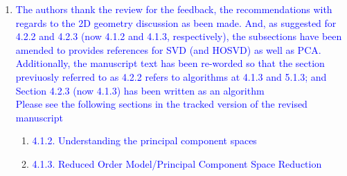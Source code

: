 \documentclass[11pt]{letter} %
\newcommand{\blue}{\textcolor{blue}}
\begin{document}
\begin{letter}
{\begin{enumerate}
\begin{enumerate}
 \begin{enumerate}
 \item \label{R_R2_GeomSetupAlgorithm_1} \blue{The authors thank the review for the feedback, the recommendations with regards to the 2D geometry discussion as been made. And, as suggested for 4.2.2 and 4.2.3 (now 4.1.2 and 4.1.3, respectively), the subsections have been amended to provides references for SVD (and HOSVD) as well as PCA. Additionally, the manuscript text has been re-worded so that the section previuosly referred to as 4.2.2 refers to algorithms at 4.1.3 and 5.1.3; and Section 4.2.3 (now 4.1.3) has been written as an algorithm}\\
   \blue{Please see the following sections in the tracked version of the revised manuscript}
   \begin{enumerate}
 \item \blue{4.1.2. Understanding the principal component spaces}
\item \blue{4.1.3. Reduced Order Model/Principal Component Space Reduction}
   \end{enumerate}
 \end{enumerate}
\end{enumerate}
\end{enumerate}
}



\end{letter}
\end{document}
